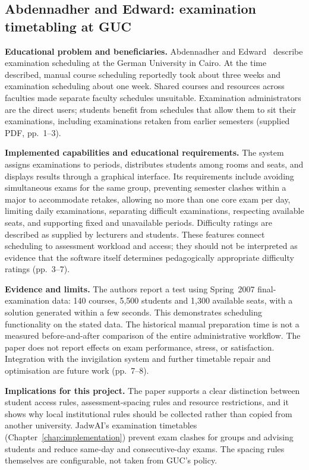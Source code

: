 \subsection{Abdennadher and Edward: examination timetabling at GUC}
\textbf{Educational problem and beneficiaries.} Abdennadher and Edward~\cite{abdennadher_guc_exams} describe examination scheduling at the German University in Cairo. At the time described, manual course scheduling reportedly took about three weeks and examination scheduling about one week. Shared courses and resources across faculties made separate faculty schedules unsuitable. Examination administrators are the direct users; students benefit from schedules that allow them to sit their examinations, including examinations retaken from earlier semesters (supplied PDF, pp.~1--3).

\textbf{Implemented capabilities and educational requirements.} The system assigns examinations to periods, distributes students among rooms and seats, and displays results through a graphical interface. Its requirements include avoiding simultaneous exams for the same group, preventing semester clashes within a major to accommodate retakes, allowing no more than one core exam per day, limiting daily examinations, separating difficult examinations, respecting available seats, and supporting fixed and unavailable periods. Difficulty ratings are described as supplied by lecturers and students. These features connect scheduling to assessment workload and access; they should not be interpreted as evidence that the software itself determines pedagogically appropriate difficulty ratings (pp.~3--7).

\textbf{Evidence and limits.} The authors report a test using Spring~2007 final-examination data: 140 courses, 5,500 students and 1,300 available seats, with a solution generated within a few seconds. This demonstrates scheduling functionality on the stated data. The historical manual preparation time is not a measured before-and-after comparison of the entire administrative workflow. The paper does not report effects on exam performance, stress, or satisfaction. Integration with the invigilation system and further timetable repair and optimisation are future work (pp.~7--8).

\textbf{Implications for this project.} The paper supports a clear distinction between student access rules, assessment-spacing rules and resource restrictions, and it shows why local institutional rules should be collected rather than copied from another university. JadwAI's examination timetables (Chapter~\ref{chap:implementation}) prevent exam clashes for groups and advising students and reduce same-day and consecutive-day exams. The spacing rules themselves are configurable, not taken from GUC's policy.

